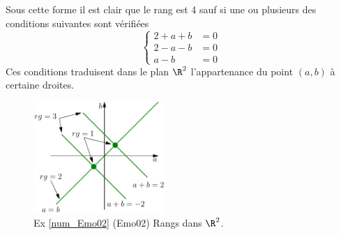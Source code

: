 Sous cette forme il est clair que le rang est 4 sauf si une ou plusieurs des conditions suivantes sont vérifiées
\[
  \left\lbrace
  \begin{aligned}
    2+a+b &= 0 \\ 2-a-b &= 0 \\ a-b &= 0
  \end{aligned}
  \right.
\]
Ces conditions traduisent dans le plan $\R^2$ l'appartenance du point $(a,b)$ à certaine droites.
\begin{figure}[h!]
  \centering
  \includegraphics[width=5cm]{Cmo02_1.pdf}
  \caption{Ex \ref{num_Emo02} (Emo02) Rangs dans $\R^2$.}
\end{figure}

